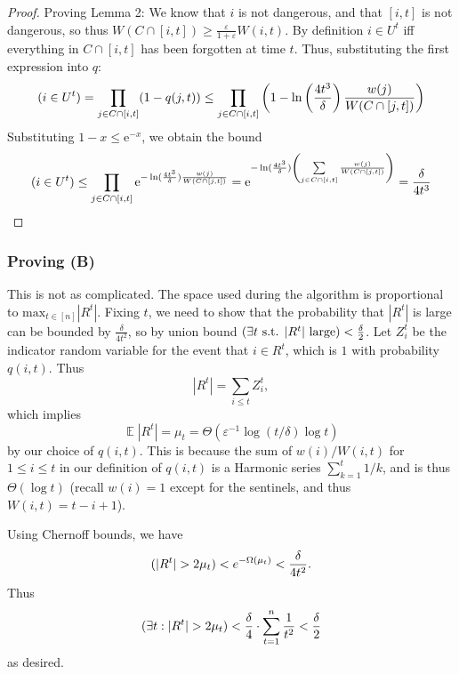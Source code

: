 \documentclass[11pt]{article}
\DeclareMathOperator*{\E}{\mathbb{E}}
\let\Pr\relax
\DeclareMathOperator*{\Pr}{\mathbb{P}}
\newcommand{\eps}{\varepsilon}
\newcommand{\ve}{\varepsilon}
\newcommand{\me}{\mathrm{e}}
\begin{document}
\begin{proof}
 Proving Lemma 2: We know that $i$ is not dangerous, and that $[i,t]$ is not
 dangerous, so thus $W(C\cap [i,t])\geq\frac{\ve}{1+\ve}W(i,t)$. By definition
 $i\in U^t$ iff everything in $C\cap[i,t]$ has been forgotten at time $t$. Thus,
 substituting the first expression into $q$:
  $$\Pr(i\in U^t) = \prod_{j\in C\cap [i,t]}(1 - q(j,t)) \leq \prod_{j\in C\cap
  [i,t]}\left(1 - \ln\left(\frac{4t^3}{\delta}\right)\frac{w(j)}{W(C\cap
  [j,t])}\right)$$
  Substituting $1-x\leq \me^{-x}$, we obtain the bound
  $$\Pr(i\in U^t)
  \leq \prod_{j\in C\cap[i,t]}\me^{-\ln(\frac{4t^3}{\delta})\frac{w (j)}{W(C\cap[j,t])}}
  =\me^{-\ln(\frac{4t^3}{\delta})\left(\sum\limits_{j\in C\cap
  [i,t]}\frac{w(j)}{W(C\cap[j,t])}\right)} = \frac{\delta}{4t^3}$$
\end{proof}

\subsubsection{Proving (B)}

This is not as complicated.
The space used during the algorithm is proportional to $\text{max}_{t\in
[n]}|R^t|$. Fixing $t$, we need to show that the probability that $|R^t|$ is large can be
bounded by $\frac{\delta}{4t^2}$, so by union bound $\Pr(\exists t \text{
s.t. } |R^t| \text{ large})<\frac{\delta}{2}$. Let $Z_i^t$ be the
indicator random variable for the event that $i \in R^t$, which is $1$
with probability $q(i,t)$. Thus
$$
|R^t| = \sum_{i\le t} Z_i^t ,
$$
which implies
$$
\E |R^t| = \mu_t = \Theta(\eps^{-1}\log(t/\delta)\log t)
$$
by our choice of $q(i, t)$. This is because the sum of $w(i)/W(i,t)$ for $1\le i\le t$ in our definition of $q(i,t)$ is a Harmonic series $\sum_{k=1}^t 1/k$, and is thus $\Theta(\log t)$ (recall $w(i) = 1$ except for the sentinels, and thus $W(i,t) = t-i+1$).

Using Chernoff bounds, we have
$$
\Pr(|R^t| > 2\mu_t) < e^{-\Omega(\mu_t)} < \frac{\delta}{4t^2} .
$$
Thus
$$
\Pr(\exists t : |R^t| > 2\mu_t) < \frac {\delta}{4} \cdot \sum_{t=1}^n \frac 1{t^2} < \frac{\delta}2
$$
as desired.


\end{document}
